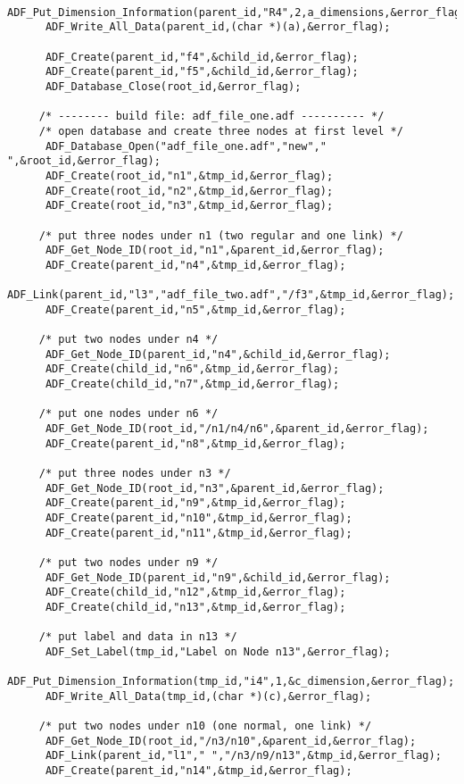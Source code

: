 \begin{verbatim}
      ADF_Put_Dimension_Information(parent_id,"R4",2,a_dimensions,&error_flag);
      ADF_Write_All_Data(parent_id,(char *)(a),&error_flag);

      ADF_Create(parent_id,"f4",&child_id,&error_flag);
      ADF_Create(parent_id,"f5",&child_id,&error_flag);
      ADF_Database_Close(root_id,&error_flag);

     /* -------- build file: adf_file_one.adf ---------- */
     /* open database and create three nodes at first level */
      ADF_Database_Open("adf_file_one.adf","new"," ",&root_id,&error_flag);
      ADF_Create(root_id,"n1",&tmp_id,&error_flag);
      ADF_Create(root_id,"n2",&tmp_id,&error_flag);
      ADF_Create(root_id,"n3",&tmp_id,&error_flag);

     /* put three nodes under n1 (two regular and one link) */
      ADF_Get_Node_ID(root_id,"n1",&parent_id,&error_flag);
      ADF_Create(parent_id,"n4",&tmp_id,&error_flag);
      ADF_Link(parent_id,"l3","adf_file_two.adf","/f3",&tmp_id,&error_flag);
      ADF_Create(parent_id,"n5",&tmp_id,&error_flag);

     /* put two nodes under n4 */
      ADF_Get_Node_ID(parent_id,"n4",&child_id,&error_flag);
      ADF_Create(child_id,"n6",&tmp_id,&error_flag);
      ADF_Create(child_id,"n7",&tmp_id,&error_flag);

     /* put one nodes under n6 */
      ADF_Get_Node_ID(root_id,"/n1/n4/n6",&parent_id,&error_flag);
      ADF_Create(parent_id,"n8",&tmp_id,&error_flag);

     /* put three nodes under n3 */
      ADF_Get_Node_ID(root_id,"n3",&parent_id,&error_flag);
      ADF_Create(parent_id,"n9",&tmp_id,&error_flag);
      ADF_Create(parent_id,"n10",&tmp_id,&error_flag);
      ADF_Create(parent_id,"n11",&tmp_id,&error_flag);

     /* put two nodes under n9 */
      ADF_Get_Node_ID(parent_id,"n9",&child_id,&error_flag);
      ADF_Create(child_id,"n12",&tmp_id,&error_flag);
      ADF_Create(child_id,"n13",&tmp_id,&error_flag);

     /* put label and data in n13 */
      ADF_Set_Label(tmp_id,"Label on Node n13",&error_flag);
      ADF_Put_Dimension_Information(tmp_id,"i4",1,&c_dimension,&error_flag);
      ADF_Write_All_Data(tmp_id,(char *)(c),&error_flag);

     /* put two nodes under n10 (one normal, one link) */
      ADF_Get_Node_ID(root_id,"/n3/n10",&parent_id,&error_flag);
      ADF_Link(parent_id,"l1"," ","/n3/n9/n13",&tmp_id,&error_flag);
      ADF_Create(parent_id,"n14",&tmp_id,&error_flag);


\end{verbatim}
